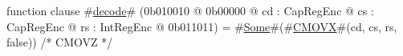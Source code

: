 function clause #\hyperref[sailMIPSzdecode]{decode}# (0b010010 @ 0b00000 @ cd : CapRegEnc @ cs : CapRegEnc @ rs : IntRegEnc @ 0b011011) = #\hyperref[sailMIPSzSome]{Some}#(#\hyperref[sailMIPSzCMOVX]{CMOVX}#(cd, cs, rs, false)) /* CMOVZ */
